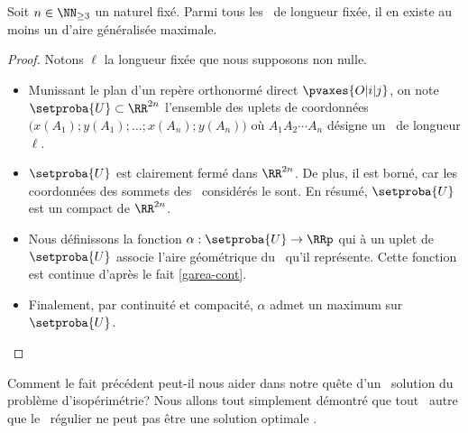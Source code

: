 \begin{fact} \label{suff-cond}
    Soit $n \in \NN_{\geq3}$ un naturel fixé.
    Parmi tous les \ncycles\ de longueur fixée, il en existe au moins un d'aire généralisée maximale.
\end{fact}


\begin{proof}
	Notons $\ell$ la longueur fixée que nous supposons non nulle.
    \begin{itemize}
        \item Munissant le plan d'un repère orthonormé direct $\pvaxes{O | i | j}$, 
	    on note $\setproba{U} \subset \RR^{2n}$ l'ensemble des uplets de coordonnées $\big( x(A_1) ; y(A_1) ; \dots ; x(A_n) ; y(A_n) \big)$ où $A_1 A_2 \cdots A_n$ désigne un \ncycle\ de longueur $\ell$.


        \item $\setproba{U}$ est clairement fermé dans $\RR^{2n}$.
        De plus, il est borné, car les coordonnées des sommets des \ncycles\ considérés le sont.
        En résumé, $\setproba{U}$ est un compact de $\RR^{2n}$.


        \item Nous définissons la fonction $\alpha: \setproba{U} \rightarrow \RRp$ qui à un uplet de $\setproba{U}$ associe l'aire géométrique du \ncycle\ qu'il représente.
        Cette fonction est continue d'après le fait \ref{garea-cont}.


        \item Finalement, par continuité et compacité, $\alpha$ admet un maximum sur $\setproba{U}$.
    \end{itemize}
\end{proof}




Comment le fait précédent peut-il nous aider dans notre quête d'un \ngone\ solution du problème d'isopérimétrie? Nous allons tout simplement démontré que tout \ncycle\ autre que le \ngone\ régulier ne peut pas être une solution \og optimale \fg.
